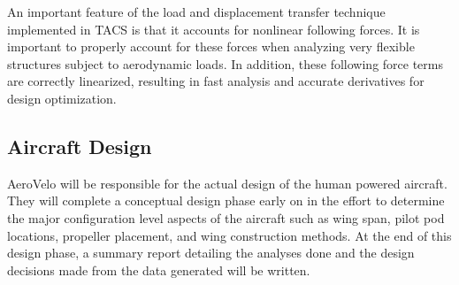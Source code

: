 \documentclass[]{aiaa-tc}
\begin{document}
An important feature of the load and displacement transfer technique
implemented in TACS is that it accounts for nonlinear following
forces.  It is important to properly account for these forces when
analyzing very flexible structures subject to aerodynamic loads. In
addition, these following force terms are correctly linearized,
resulting in fast analysis and accurate derivatives for design
optimization.





    \subsection{Aircraft Design}

        AeroVelo will be responsible for the actual design of the human powered aircraft. They will complete a conceptual design 
        phase early on in the effort to determine the major configuration level aspects of the aircraft such as wing span, pilot pod
        locations, propeller placement, and wing construction methods. At the end of this design phase, a summary report detailing
        the analyses done and the design decisions made from the data generated will be written. 
\end{document}
